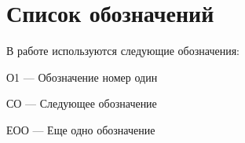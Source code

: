 \chapter*{Список обозначений}

\noindent В работе используются следующие обозначения:

\noindent О1 --- Обозначение номер один

\noindent СО --- Следующее обозначение

\noindent ЕОО --- Еще одно обозначение

\clearpage